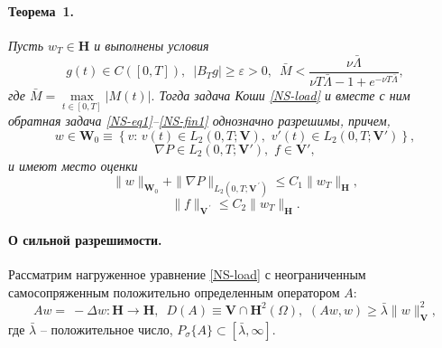 \paragraph{Теорема~1.} {\it
Пусть $w_T\in\mathbf{H}$ и выполнены условия
\begin{equation}\label{NS-cond2}
g(t)\in C([0,T]),\,\,\, \left|B_Tg\right|\geq\varepsilon>0,\,\,\, \bar{M}<\frac{\nu \bar{\Lambda}}{\nu T\bar{\Lambda}-1+e^{-\nu T\bar{\Lambda}}},
\end{equation}
где $\bar{M}=\max\limits_{t\in[0,T]}|M(t)|.$
Тогда задача Коши \eqref{NS-load} и вместе с ним обратная задача \eqref{NS-eq1}--\eqref{NS-fin1} однозначно разрешимы, причем,
$$
w\in \mathbf{W}_0\equiv \left\{v:\, v(t)\in L_2(0,T;\mathbf{V}),\,\, v'(t)\in L_2(0,T;\mathbf{V}')\right\},
$$
$$
\nabla P\in L_2(0,T; \mathbf{V}'),\,\, f\in \mathbf{V}',
$$
и имеют место оценки
\begin{equation} \label{NS-est1}
\|w\|_{\mathbf{W}_0}+\|\nabla P\|_{L_2(0,T; \mathbf{V}^{\,'})}\leq C_1\|w_T\|_{\mathbf{H}},
\end{equation}
\begin{equation} \label{NS-est2}
\|f\|_{\mathbf{V}^{\,'}}\leq C_2\|w_T\|_{\mathbf{H}}.
\end{equation}
}

\paragraph{О сильной разрешимости.}
Рассматрим нагруженное уравнение \eqref{NS-load} с неограниченным самосопряженным положительно определенным оператором $A$:
\begin{equation} \label{NS-opA2}
Aw=\ - \Delta w: \mathbf{H}\to\mathbf{H},\,\,\, D(A)\equiv \mathbf{V}\cap \mathbf{H}^2(\Omega),\,\, (Aw,w)\geq\bar{\lambda}\|w\|_{\mathbf{V}}^2,
\end{equation}
где $\bar{\lambda}$ -- положительное число, $P_\sigma\{A\}\subset[\bar{\lambda},\infty].$

